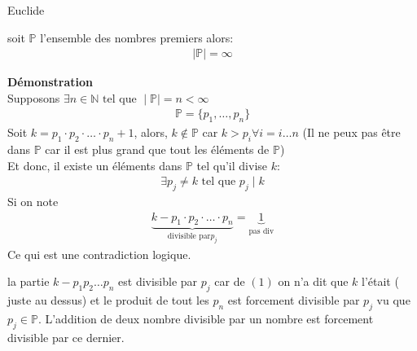 \begin{parag}{Euclide}
        \begin{theoreme}
           soit $ \mathbb{P}$ l'ensemble des nombres premiers alors:
           \begin{align*}
               \mid \mathbb{P} \mid = \infty
           \end{align*}
        \end{theoreme}
        \textbf{Démonstration} \\
        Supposons $ \exists n \in \mathbb{N} \text{ tel que } \mid \mathbb{P} \mid = n < \infty$ 
        \begin{align*}
        \mathbb{P} = \{ p_1, \dots, p_n\}
        \end{align*}
        Soit $k = p_1  \cdot p_2 \cdot\dots \cdot p_{n} + 1$,  alors, $k \notin \mathbb{P}$ car $k > p_i \forall i = i \dots n$ (Il ne peux pas être dans $ \mathbb{P}$ car il est plus grand que tout les éléments de $ \mathbb{P}$) \\
        Et donc, il existe un éléments dans $ \mathbb{P}$ tel qu'il divise $k$:
        \begin{align*}
            \exists p_j \neq k \text{ tel que } p_j \mid k
        \end{align*}
       Si on note
       \begin{align*}
           \underbrace{k - p_1 \cdot p_2 \cdot \dots \cdot p_n}_{ \text{divisible par} p_j} = \underbrace{1}_{ \text{pas div}}
       \end{align*}
       Ce qui est une contradiction logique.
       \begin{framedremark}
           la partie $k - p_1p_2 \dots p_n$ est divisible par $p_j$ car de $(1)$ on n'a dit que $k$ l'était ( juste au dessus) et le produit de tout les $p_n$ est forcement divisible par $p_j$ vu que $p_j \in \mathbb{P}$. L'addition de deux nombre divisible par un nombre est forcement divisible par ce dernier.
       \end{framedremark}
\end{parag}
      










